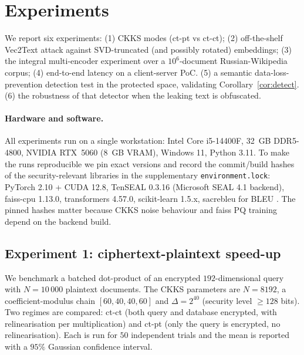 \documentclass[11pt,a4paper]{article}
\begin{document}
\section{Experiments}\label{sec:experiments}

We report six experiments:
(1) CKKS modes (ct-pt vs ct-ct);
(2) off-the-shelf Vec2Text attack against SVD-truncated (and possibly
rotated) embeddings;
(3) the integral multi-encoder experiment over a $10^6$-document
Russian-Wikipedia corpus;
(4) end-to-end latency on a client-server PoC.
(5) a semantic data-loss-prevention detection test in the
protected space, validating Corollary~\ref{cor:detect}.
(6) the robustness of that detector when the leaking text is obfuscated.

\paragraph{Hardware and software.} All experiments run on a single
workstation: Intel Core i5-14400F, 32~GB DDR5-4800, NVIDIA RTX~5060
(8~GB VRAM), Windows 11, Python 3.11. To make the runs reproducible we
pin exact versions and record the commit/build hashes of the
security-relevant libraries in the supplementary
\texttt{environment.lock}: PyTorch 2.10 + CUDA 12.8,
TenSEAL 0.3.16 (Microsoft SEAL 4.1 backend),
faiss-cpu 1.13.0, transformers 4.57.0, scikit-learn 1.5.x,
sacrebleu for BLEU \cite{ref_bleu}. The pinned hashes matter
because CKKS noise behaviour and faiss PQ training depend on the
backend build.

\subsection{Experiment 1: ciphertext-plaintext speed-up}\label{ssec:ckks-modes}

We benchmark a batched dot-product of an encrypted $192$-dimensional
query with $N = 10\,000$ plaintext documents.
The CKKS parameters are $N = 8192$, a coefficient-modulus chain
$[60, 40, 40, 60]$ and $\Delta = 2^{40}$ (security level $\geq 128$ bits).
Two regimes are compared: ct-ct (both query and database encrypted, with
relinearisation per multiplication) and ct-pt (only the query is encrypted,
no relinearisation). Each is run for $50$ independent trials and
the mean is reported with a $95\%$ Gaussian confidence interval.
\end{document}
